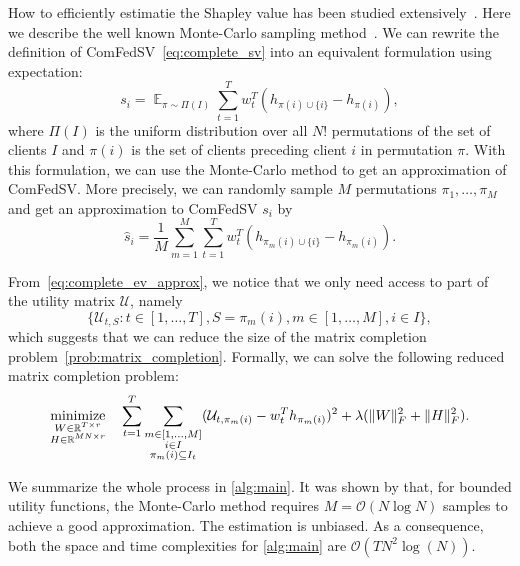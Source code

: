 How to efficiently estimatie the Shapley value has been studied extensively~\cite{ghorbani2019data,jia2019towards}. Here we describe the well known Monte-Carlo sampling method~\cite{metropolis1949monte, ghorbani2019data}. We can rewrite the definition of ComFedSV~\eqref{eq:complete_sv} into an equivalent formulation using expectation:
\begin{equation} \label{eq:complete_ev_expectation}
    s_i = \mathop{\mathbb{E}}_{\pi \sim \Pi(I)} \sum_{t=1}^T w_t^T\left(h_{ \pi(i) \cup \{i\}}  - h_{ \pi(i) }\right),
\end{equation}
where $\Pi(I)$ is the uniform distribution over all $N!$ permutations of the set of clients $I$ and $\pi(i)$ is the set of clients preceding client $i$ in permutation $\pi$. With this formulation, we can use the Monte-Carlo method to get an approximation of ComFedSV. More precisely, we can randomly sample $M$ permutations $\pi_1, \dots, \pi_M$ and get an approximation to ComFedSV $s_i$ by 
\begin{equation} \label{eq:complete_ev_approx}
    \hat s_i = \frac{1}{M}\sum_{m=1}^M \sum_{t=1}^T w_t^T\left(h_{ \pi_m(i) \cup \{i\}}  - h_{ \pi_m(i) }\right).
\end{equation}

From~\eqref{eq:complete_ev_approx}, we notice that we only need access to part of the utility matrix $\mathcal{U}$, namely 
\[ \{\mathcal{U}_{t, S}: t \in [1, \dots, T], S = \pi_m(i), m \in [1,\dots,M], i \in I\}, \]
which suggests that we can reduce the size of the matrix completion problem~\eqref{prob:matrix_completion}. Formally, we can solve the following reduced matrix completion problem:
\begin{equation}
\label{prob:matrix_completion_reduced}
\displaystyle\mathop{\hbox{\rm minimize}}_{\substack{W \in \mathbb{R}^{T \times r}\\ H \in \mathbb{R}^{MN \times r}}}\enspace\enspace \sum_{t=1}^T\sum_{ \substack{m \in [1,\dots, M] \\ i \in I \\ \pi_m(i) \subseteq I_t  } } (\mathcal{U}_{t,\pi_m(i)} - w_t^Th_{\pi_m(i)})^2 + \lambda(\|W\|_F^2 + \|H\|_F^2).
\end{equation}

We summarize the whole process in \autoref{alg:main}. It was shown by \cite{maleki2013bounding} that, for bounded utility functions, the Monte-Carlo method requires $M = \mathcal{O}(N\log N)$ samples to achieve a good approximation.  The estimation is unbiased. As a consequence, both the space and time complexities for \autoref{alg:main} are $\mathcal{O}(TN^2\log(N))$. 


